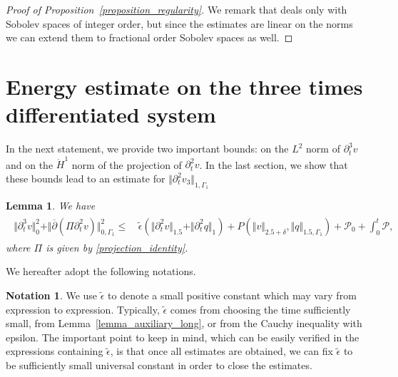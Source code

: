 \documentclass[10pt,reqno]{amsart}
\theoremstyle{plain}
\newtheorem{lemma}[theorem]{Lemma}
\theoremstyle{definition}
\newtheorem{notation}[theorem]{Notation}
\numberwithin{equation}{section}
\newcommand{\ccP}{\mathscr{P}}
\newcommand{\Ga}{\Gamma}
\newcommand{\de}{\delta}
\newcommand{\norm}[1]{\Vert#1\Vert}
\def\referee#1{{\color{green}\hbox{\bf ~#1~}}} %
\begin{document}
\begin{proof}[Proof of Proposition~\ref{proposition_regularity}]
We remark that \cite{DongKimEllipticBMOHigerOrder} 
deals only with Sobolev spaces of integer order, but since the estimates
are linear on the norms we can extend them to fractional order Sobolev spaces as well.
\end{proof}


\section{Energy estimate on the three times differentiated system}
\label{section_L_2_estimate} 



In the next statement, we provide two important bounds: on
the $L^2$ norm of $\partial_{t}^{3}v$
and on the $\dot H^{1}$ norm of the projection of 
$\partial_{t}^2v$.
In the last section, we show that these bounds lead to an estimate
for
$\Vert\partial_{t}^2 v_3\Vert_{1,\Gamma_1}$

\begin{lemma}
\label{L01}
We have
\begin{align}
\begin{split}
\norm{ \partial^3_t v }^2_0 
+  \norm{ \overline{\partial} (\Pi \partial^2_t v)}^2_{0,\Ga_1}
\leq &
 \, 
 \widetilde{\epsilon} ( \norm{\partial^2_t v }_{1.5} + \norm{\partial^2_t q}_1 )
   + 
 P(\norm{v}_{2.5+\de}, \norm{q}_{1.5,\Ga_1})
+
\ccP_0 + \int_0^t \ccP,
\end{split}
\label{partial_3_t_v_estimate}
\end{align}
where $\Pi$ is given by \eqref{projection_identity}.
\end{lemma}




We hereafter adopt the following notations.

\begin{notation}
We  use $\widetilde{\epsilon} $ to denote a small positive constant
which may vary from expression to expression. Typically, $\widetilde{\epsilon}$
comes from choosing the time sufficiently small, from Lemma~\ref{lemma_auxiliary_long},
 or from the 
Cauchy inequality with epsilon. The important point to keep in mind, which 
can be easily verified in the expressions containing $\widetilde{\epsilon}$, 
is that once all estimates
are obtained, we can fix $\widetilde{\epsilon}$ 
to be sufficiently small universal constant in order to close the estimates.
\end{notation} 
\end{document}
